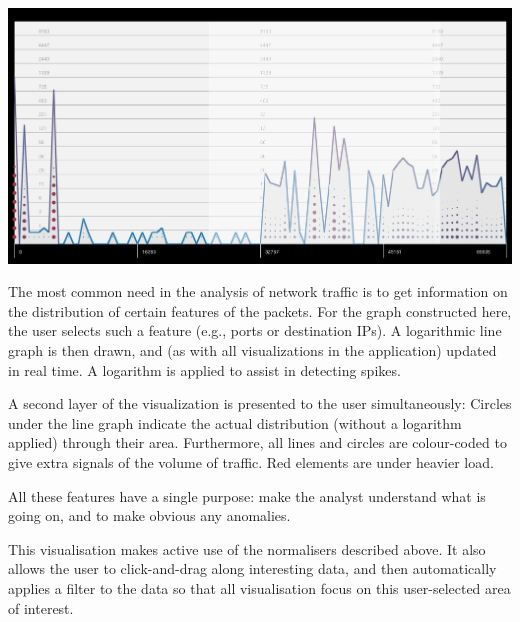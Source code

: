 \includegraphics[width=\linewidth]{materials/distribution.jpg}

The most common need in the analysis of network traffic is to get information on the distribution of certain features of the packets. For the graph constructed here, the user selects such a feature (e.g., ports or destination IPs). A logarithmic line graph is then drawn, and (as with all visualizations in the application) updated in real time. A logarithm is applied to assist in detecting spikes.

A second layer of the visualization is presented to the user simultaneously: Circles under the line graph indicate the actual distribution (without a logarithm applied) through their area. Furthermore, all lines and circles are colour-coded to give extra signals of the volume of traffic. Red elements are under heavier load.

All these features have a single purpose: make the analyst understand what is going on, and to make obvious any anomalies.

This visualisation makes active use of the normalisers described above. It also allows the user to click-and-drag along interesting data, and then automatically applies a filter to the data so that all visualisation focus on this user-selected area of interest.
